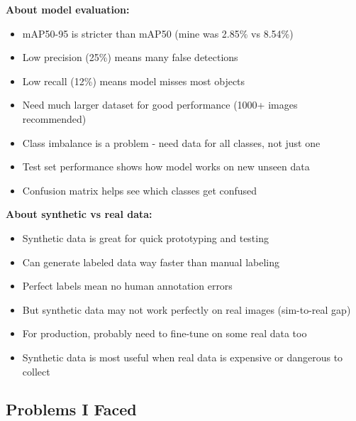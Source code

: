 \textbf{About model evaluation:}
\begin{itemize}
	\item mAP50-95 is stricter than mAP50 (mine was 2.85\% vs 8.54\%)
	\item Low precision (25\%) means many false detections
	\item Low recall (12\%) means model misses most objects
	\item Need much larger dataset for good performance (1000+ images recommended)
	\item Class imbalance is a problem - need data for all classes, not just one
	\item Test set performance shows how model works on new unseen data
	\item Confusion matrix helps see which classes get confused
\end{itemize}

\textbf{About synthetic vs real data:}
\begin{itemize}
	\item Synthetic data is great for quick prototyping and testing
	\item Can generate labeled data way faster than manual labeling
	\item Perfect labels mean no human annotation errors
	\item But synthetic data may not work perfectly on real images (sim-to-real gap)
	\item For production, probably need to fine-tune on some real data too
	\item Synthetic data is most useful when real data is expensive or dangerous to collect
\end{itemize}

\subsection{Problems I Faced}

